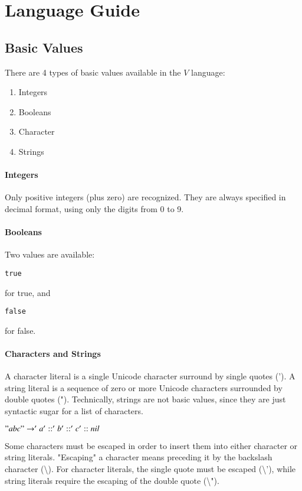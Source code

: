\documentclass{article}
\def\code#1{\begin{footnotesize}\texttt{#1}\end{footnotesize}}
\begin{document}
\section{Language Guide}

\subsection{Basic Values}

There are 4 types of basic values available in the $V$ language:

\begin{enumerate}
  \item Integers
  \item Booleans
  \item Character
  \item Strings
\end{enumerate}

\paragraph{Integers}
Only positive integers (plus zero) are recognized.
They are always specified in decimal format,  using only the digits from 0 to 9.

\paragraph{Booleans}
Two values are available: \code{true} for true, and \code{false} for false.

\paragraph{Characters and Strings}
A character literal is a single Unicode character surround by single quotes (').
A string literal is a sequence of zero or more Unicode characters surrounded by double quotes (").
Technically, strings are not basic values, since they are just syntactic sugar for a list of characters.

$"abc" \rightarrow 'a' :: 'b' :: 'c' :: nil$

\bigskip

Some characters must be escaped in order to insert them into either character or string literals.
"Escaping" a character means preceding it by the backslash character (\textbackslash).
For character literals, the single quote must be escaped (\textbackslash'), while string literals require the escaping of the double quote (\textbackslash").
\end{document}
